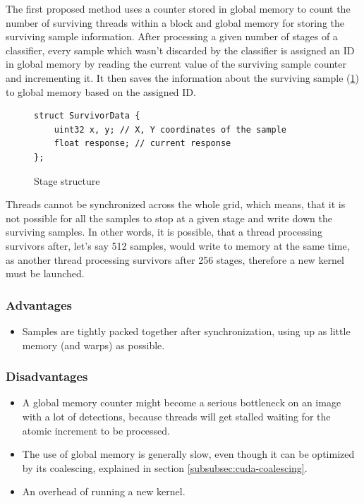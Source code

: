 The first proposed method uses a counter stored in global memory to count the number of surviving threads within a block and global memory for storing the surviving sample information. After processing a given number of stages of a classifier, every sample which wasn't discarded by the classifier is assigned an ID in global memory by reading the current value of the surviving sample counter and incrementing it. It then saves the information about the surviving sample (\ref{fig:survivordata}) to global memory based on the assigned ID.

\begin{figure}[h!] \label{fig:survivordata}
\begin{verbatim}
struct SurvivorData {
    uint32 x, y; // X, Y coordinates of the sample
    float response; // current response
};
\end{verbatim}
\caption{Stage structure}
\end{figure}

Threads cannot be synchronized across the whole grid, which means, that it is not possible for all the samples to stop at a given stage and write down the surviving samples. In other words, it is possible, that a thread processing survivors after, let's say 512 samples, would write to memory at the same time, as another thread processing survivors after 256 stages, therefore a new kernel must be launched.

\subsubsection{Advantages}

\begin{itemize}
	\item Samples are tightly packed together after synchronization, using up as little memory (and warps) as possible.
\end{itemize}

\subsubsection{Disadvantages}

\begin{itemize}
	\item A global memory counter might become a serious bottleneck on an image with a lot of detections, because threads will get stalled waiting for the atomic increment to be processed.
	\item The use of global memory is generally slow, even though it can be optimized by its coalescing, explained in section \ref{subsubsec:cuda-coalescing}.
	\item An overhead of running a new kernel.
\end{itemize}

